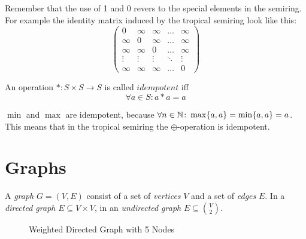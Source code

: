 Remember that the use of 1 and 0 revers to the special elements in the semiring. For example the identity matrix induced by the tropical semiring look like this:
$$
\left(
\begin{matrix}
    0 & \infty & \infty & \dots & \infty\\
    \infty & 0 & \infty & \dots & \infty\\
    \infty & \infty & 0 & \dots & \infty\\
    \vdots & \vdots & \vdots & \ddots & \vdots\\
    \infty & \infty & \infty & \dots & 0
\end{matrix}
\right)
$$
\begin{definition}
    An operation $*\colon S \times S \to S$ is called $idempotent$ iff 
    $$\forall a \in S: a * a = a$$
\end{definition}
\begin{example}
    $\min$ and $\max$ are idempotent, because $\forall n \in \mathbb{N}\colon \max\{a, a\} = \min\{a, a\} = a$. This means that in the tropical semiring the $\oplus$-operation is idempotent.
\end{example}

\section{Graphs}
\begin{definition}
    A \textit{graph} $G = (V, E)$ consist of a set of \textit{vertices} $V$ and a set of \textit{edges} $E$. In a \textit{directed graph} $E \subseteq V \times V$, in an \textit{undirected graph} $E \subseteq \binom{V}{2}$. 
\end{definition}
\begin{figure}[ht]
    \centering
    \caption{Weighted Directed Graph with 5 Nodes}
\end{figure}

